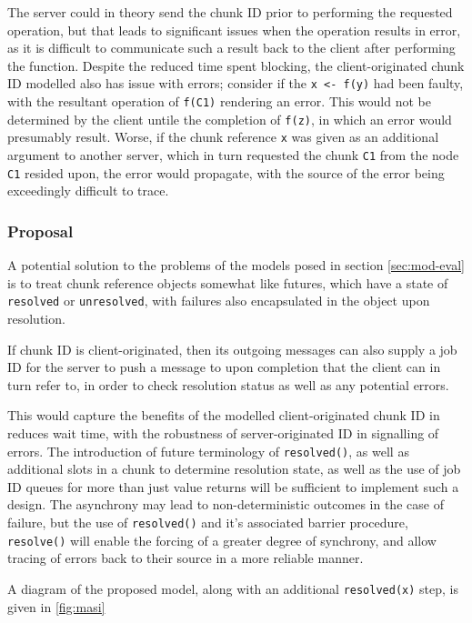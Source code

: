 The server could in theory send the chunk ID prior to performing the requested
operation, but that leads to significant issues when the operation results in
error, as it is difficult to communicate such a result back to the client after
performing the function.
Despite the reduced time spent blocking, the client-originated chunk ID
modelled also has issue with errors; consider if the \texttt{x <- f(y)} had
been faulty, with the resultant operation of \texttt{f(C1)} rendering an error.
This would not be determined by the client untile the completion of
\texttt{f(z)}, in which an error would presumably result.
Worse, if the chunk reference \texttt{x} was given as an additional argument to
another server, which in turn requested the chunk \texttt{C1} from the node
\texttt{C1} resided upon, the error would propagate, with the source of the
error being exceedingly difficult to trace.

\subsubsection{Proposal}

A potential solution to the problems of the models posed in section
\cref{sec:mod-eval} is to treat chunk reference objects somewhat like futures,
which have a state of \texttt{resolved} or \texttt{unresolved}, with failures
also encapsulated in the object upon resolution\cite{bengtsson19:_futur_r}.

If chunk ID is client-originated, then its outgoing messages can also supply a
job ID for the server to push a message to upon completion that the client can
in turn refer to, in order to check resolution status as well as any potential
errors.

This would capture the benefits of the modelled client-originated chunk ID in
reduces wait time, with the robustness of server-originated ID in signalling of
errors.
The introduction of future terminology of \texttt{resolved()}, as well as
additional slots in a chunk to determine resolution state, as well as the use
of job ID queues for more than just value returns will be sufficient to
implement such a design.
The asynchrony may lead to non-deterministic outcomes in the case of failure,
but the use of \texttt{resolved()} and it's associated barrier procedure,
\texttt{resolve()} will enable the forcing of a greater degree of synchrony,
and allow tracing of errors back to their source in a more reliable manner.

A diagram of the proposed model, along with an additional \texttt{resolved(x)}
step, is given in \cref{fig:masi}


